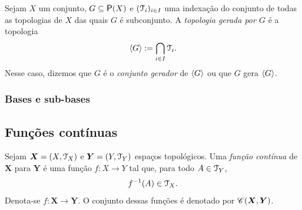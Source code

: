 \begin{definition}
Sejam $X$ um conjunto, $G \subseteq \p(X)$ e $(\mathcal{T}_i)_{i \in I}$ uma indexação do conjunto de todas as topologias de $X$ das quais $G$ é subconjunto. A \emph{topologia gerada por $G$} é a topologia
	\begin{equation*}
	\left\langle G \right\rangle := \bigcap_{i \in I} \mathcal{T}_i.
	\end{equation*}
Nesse caso, dizemos que $G$ é o \emph{conjunto gerador} de $\left\langle G \right\rangle$ ou que $G$ gera $\left\langle G \right\rangle$.
\end{definition}

\subsubsection{Bases e sub-bases}


\subsection{Funções contínuas}

\begin{definition}
Sejam $\bm X = (X,\mathcal{T}_X)$ e $\bm Y = (Y,\mathcal{T}_Y)$ espaços topológicos. Uma \emph{função contínua} de $\bm X$ para $\bm Y$ é uma função $f: X \to Y$ tal que, para todo $A \in \mathcal{T}_Y$,
	\begin{equation*}
	f^{-1}(A) \in \mathcal{T}_X.
	\end{equation*}
Denota-se $f: \bm X \to \bm Y$. O conjunto dessas funções é denotado por $\mathscr{C}(\bm X,\bm Y)$.
\end{definition}

